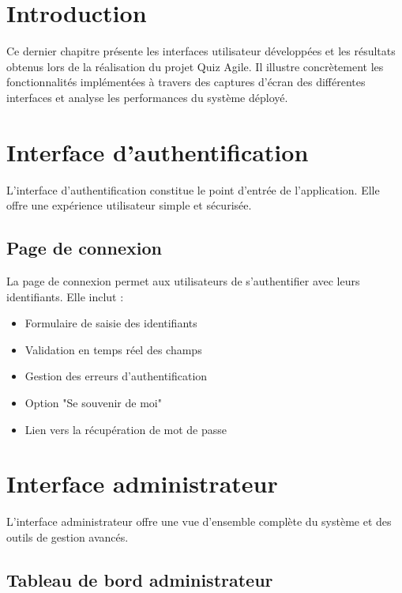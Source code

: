 \documentclass[12pt,a4paper]{report}
\begin{document}
\setcounter{section}{0}

\section{Introduction}

Ce dernier chapitre présente les interfaces utilisateur développées et les résultats obtenus lors de la réalisation du projet Quiz Agile. Il illustre concrètement les fonctionnalités implémentées à travers des captures d'écran des différentes interfaces et analyse les performances du système déployé.

\section{Interface d'authentification}

L'interface d'authentification constitue le point d'entrée de l'application. Elle offre une expérience utilisateur simple et sécurisée.

\subsection{Page de connexion}

La page de connexion permet aux utilisateurs de s'authentifier avec leurs identifiants. Elle inclut :

\begin{itemize}
    \item Formulaire de saisie des identifiants
    \item Validation en temps réel des champs
    \item Gestion des erreurs d'authentification
    \item Option "Se souvenir de moi"
    \item Lien vers la récupération de mot de passe
\end{itemize}

\section{Interface administrateur}

L'interface administrateur offre une vue d'ensemble complète du système et des outils de gestion avancés.

\subsection{Tableau de bord administrateur}
\end{document}
